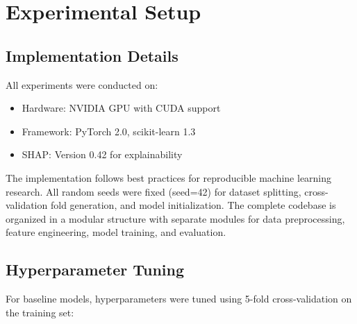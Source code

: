 \documentclass[journal]{IEEEtran}
\begin{document}
\section{Experimental Setup}

\subsection{Implementation Details}

All experiments were conducted on:
\begin{itemize}
\item Hardware: NVIDIA GPU with CUDA support
\item Framework: PyTorch 2.0, scikit-learn 1.3
\item SHAP: Version 0.42 for explainability
\end{itemize}

The implementation follows best practices for reproducible machine learning research. All random seeds were fixed (seed=42) for dataset splitting, cross-validation fold generation, and model initialization. The complete codebase is organized in a modular structure with separate modules for data preprocessing, feature engineering, model training, and evaluation.

\subsection{Hyperparameter Tuning}

For baseline models, hyperparameters were tuned using 5-fold cross-validation on the training set:

\begin{table}[h]
\centering
\caption{Baseline Model Hyperparameters}
\label{tab:hyperparams}
\end{table}
\end{document}
